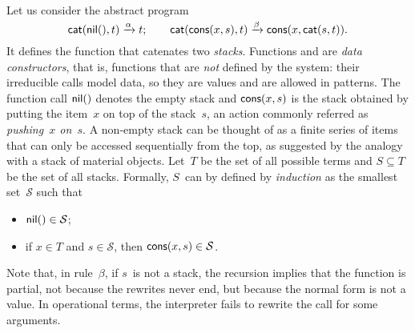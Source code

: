 Let us consider the abstract program
\begin{equation*}
\textsf{cat}(\textsf{nil}(),t)     \xrightarrow{\smash{\alpha}} t;\qquad
\textsf{cat}(\textsf{cons}(x,s),t) \xrightarrow{\smash{\beta}}
                                \textsf{cons}(x,\textsf{cat}(s,t)).
\end{equation*}
It defines the function  that
catenates  two \emph{stacks}. Functions
 and  are \emph{data
  constructors}, that is,
functions that are \emph{not} defined by the system: their irreducible
calls model data, so they are values and are allowed in patterns. The
function call \(\textsf{nil}()\) denotes the empty stack and
\(\textsf{cons}(x,s)\) is the stack obtained by putting the item~\(x\) on
top of the stack~\(s\), an action commonly referred as
\textsl{pushing~\(x\) on~\(s\)}. A non\hyp{}empty stack can be thought
of as a finite series of items that can only be accessed sequentially
from the top, as suggested by the analogy with a stack of material
objects. Let~\(T\) be the set of all possible terms and \(S \subseteq
T\) be the set of all stacks. Formally, \(S\)~can by defined by
\emph{induction} as the smallest set~\(\mathcal{S}\) such
that
\begin{itemize}

  \item \(\textsf{nil}() \in \mathcal{S}\);\label{def:stack}

  \item if \(x \in T\) and \(s \in \mathcal{S}\), then
    \(\textsf{cons}(x,s) \in \mathcal{S}\).

\end{itemize}

Note that, in rule~\(\beta\), if \(s\)~is not a stack, the recursion
implies that the function  is partial, not because the
rewrites never end, but because the normal form is not a value. In operational terms, the
interpreter fails to rewrite the call for some arguments.

